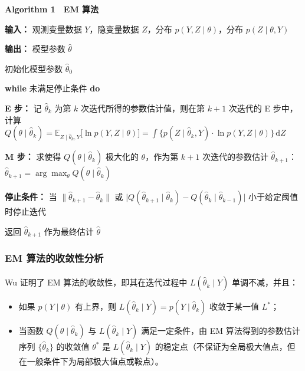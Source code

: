 \documentclass[12pt,a4paper]{ctexart}
\numberwithin{figure}{section}
\numberwithin{table}{section}
\begin{document}
\begin{framed}
\textbf{Algorithm 1　EM 算法}

\textbf{输入：} 观测变量数据 $Y$，隐变量数据 $Z$，分布 $p(Y,Z\mid\theta)$，分布 $p(Z\mid\theta,Y)$

\textbf{输出：} 模型参数 $\hat{\theta}$

初始化模型参数 $\hat{\theta}_0$

\textbf{while} 未满足停止条件 \textbf{do}

\hspace*{1.5em}\textbf{E 步：} 记 $\hat{\theta}_k$ 为第 $k$ 次迭代所得的参数估计值，则在第 $k+1$ 次迭代的 E 步中，计算 \\
$Q(\theta\mid\hat{\theta}_k) = \mathbb{E}_{Z\mid\hat{\theta}_k,Y}\big[\ln p(Y,Z\mid\theta)\big] = \int \big\{ p(Z\mid\hat{\theta}_k,Y)\cdot\ln p(Y,Z\mid\theta) \big\}\, \mathrm{d}Z$

\hspace*{1.5em}\textbf{M 步：} 求使得 $Q(\theta\mid\hat{\theta}_k)$ 极大化的 $\theta$，作为第 $k+1$ 次迭代的参数估计 $\hat{\theta}_{k+1}$：$\hat{\theta}_{k+1} = \arg\max_{\theta} Q(\theta\mid\hat{\theta}_k)$

\textbf{停止条件：} 当 $\big\|\hat{\theta}_{k+1} - \hat{\theta}_k\big\|$ 或 $\big| Q(\hat{\theta}_{k+1}\mid\hat{\theta}_k) - Q(\hat{\theta}_k\mid\hat{\theta}_{k-1}) \big|$ 小于给定阈值时停止迭代

返回 $\hat{\theta}_{k+1}$ 作为最终估计 $\hat{\theta}$

\end{framed}

\subsubsection{EM 算法的收敛性分析}

Wu\textsuperscript{\cite{ref6}} 证明了 EM 算法的收敛性，即其在迭代过程中 $L(\hat{\theta}_k\mid Y)$ 单调不减，并且：

\begin{itemize}
  \item 如果 $p(Y\mid\theta)$ 有上界，则 $L(\hat{\theta}_k\mid Y) = p(Y\mid\hat{\theta}_k)$ 收敛于某一值 $L^*$；
  \item 当函数 $Q(\theta\mid\hat{\theta}_k)$ 与 $L(\hat{\theta}_k\mid Y)$ 满足一定条件，由 EM 算法得到的参数估计序列 $\{\hat{\theta}_k\}$ 的收敛值 $\theta^*$ 是 $L(\hat{\theta}_k\mid Y)$ 的稳定点（不保证为全局极大值点，但在一般条件下为局部极大值点或鞍点）。
\end{itemize}
\end{document}

